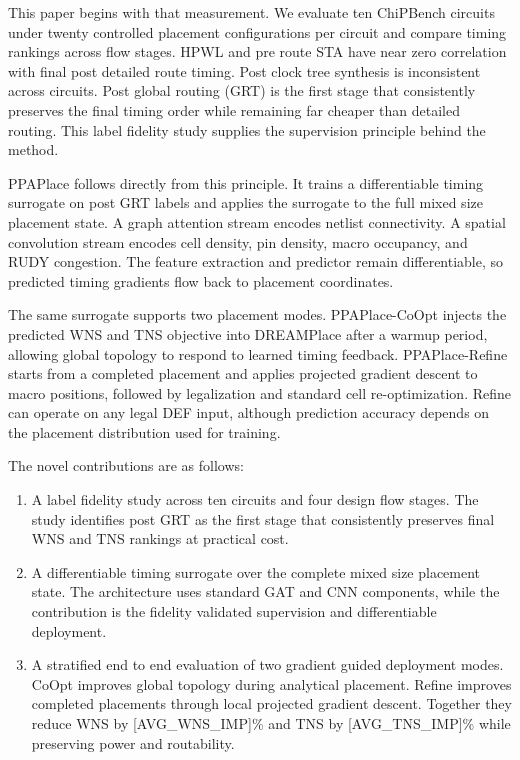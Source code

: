 \documentclass[sigconf,anonymous,review,9pt]{acmart}
\begin{document}
This paper begins with that measurement. We evaluate ten ChiPBench
circuits under twenty controlled placement configurations per circuit
and compare timing rankings across flow stages. HPWL and pre route STA
have near zero correlation with final post detailed route timing.
Post clock tree synthesis is inconsistent across circuits. Post global
routing (GRT) is the first stage that consistently preserves the final
timing order while remaining far cheaper than detailed routing. This
label fidelity study supplies the supervision principle behind the
method.

PPAPlace follows directly from this principle. It trains a
differentiable timing surrogate on post GRT labels and applies the
surrogate to the full mixed size placement state. A graph attention
stream encodes netlist connectivity. A spatial convolution stream
encodes cell density, pin density, macro occupancy, and RUDY congestion.
The feature extraction and predictor remain differentiable, so predicted
timing gradients flow back to placement coordinates.

The same surrogate supports two placement modes. PPAPlace-CoOpt injects
the predicted WNS and TNS objective into DREAMPlace after a warmup
period, allowing global topology to respond to learned timing feedback.
PPAPlace-Refine starts from a completed placement and applies projected
gradient descent to macro positions, followed by legalization and
standard cell re-optimization. Refine can operate on any legal DEF input,
although prediction accuracy depends on the placement distribution used
for training.

The novel contributions are as follows:

\begin{enumerate}
    \item A label fidelity study across ten circuits and four design
    flow stages. The study identifies post GRT as the first stage that
    consistently preserves final WNS and TNS rankings at practical cost.

    \item A differentiable timing surrogate over the complete mixed
    size placement state. The architecture uses standard GAT and CNN
    components, while the contribution is the fidelity validated
    supervision and differentiable deployment.

    \item A stratified end to end evaluation of two gradient guided
    deployment modes. CoOpt improves global topology during analytical
    placement. Refine improves completed placements through local
    projected gradient descent. Together they reduce WNS by
    [AVG_WNS_IMP]\% and TNS by [AVG_TNS_IMP]\% while preserving power
    and routability.
\end{enumerate}
\end{document}
